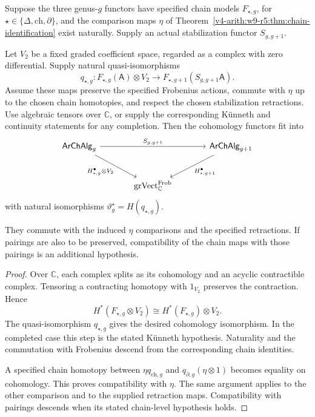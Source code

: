 \begin{theorem}
\label{v4-arith:w9-r5:thm:genus-inclusion}
Suppose the three genus-\(g\) functors have specified chain models
\(F_{\star,g}\), for \(\star\in\{\Delta,\mathrm{ch},\partial\}\),
and the comparison maps \(\eta\) of
Theorem~\ref{v4-arith:w9-r5:thm:chain-identification} exist naturally.
Supply an actual stabilization functor \(S_{g,g+1}\).

Let \(V_2\) be a fixed graded coefficient space, regarded as a
complex with zero differential. Supply natural quasi-isomorphisms
\[
 q_{\star,g}:F_{\star,g}(\mathsf A)\otimes V_2
 \longrightarrow F_{\star,g+1}(S_{g,g+1}\mathsf A).
\]
Assume these maps preserve the specified Frobenius actions, commute
with \(\eta\) up to the chosen chain homotopies, and respect the
chosen stabilization retractions. Use algebraic tensors over
\(\mathbb C\), or supply the corresponding K\"unneth and continuity
statements for any completion. Then the cohomology functors fit into
\begin{equation}
\label{v4-arith:w9-r5:eq:genus-inclusion}
\begin{tikzcd}[column sep=large,row sep=large]
\mathsf{ArChAlg}_{g}\arrow[rr,"S_{g,g+1}"]
 \arrow[dr,"H^{\bullet}_{\star,g}\otimes V_{2}"']
&& \mathsf{ArChAlg}_{g+1}\arrow[dl,"H^{\bullet}_{\star,g+1}"]\\
& \mathrm{grVect}_{\mathbb{C}}^{\mathrm{Frob}}
\end{tikzcd}
\end{equation}
with natural isomorphisms \(\vartheta_g^\star=H(q_{\star,g})\).

They commute with the induced \(\eta\) comparisons and the
specified retractions. If pairings are also to be preserved,
compatibility of the chain maps with those pairings is an additional
hypothesis.
\end{theorem}
\begin{proof}
Over \(\mathbb C\), each complex splits as its cohomology and an
acyclic contractible complex. Tensoring a contracting homotopy with
\(1_{V_2}\) preserves the contraction. Hence
\[
 H^*(F_{\star,g}\otimes V_2)
 \cong H^*(F_{\star,g})\otimes V_2.
\]
The quasi-isomorphism \(q_{\star,g}\) gives the desired cohomology
isomorphism. In the completed case this step is the stated K\"unneth
hypothesis. Naturality and the commutation with Frobenius descend
from the corresponding chain identities.

A specified chain homotopy between
\(\eta q_{\mathrm{ch},g}\) and
\(q_{\partial,g}(\eta\otimes1)\) becomes equality on cohomology.
This proves compatibility with \(\eta\). The same argument applies
to the other comparison and to the supplied retraction maps.
Compatibility with pairings descends when its stated chain-level
hypothesis holds.
\end{proof}

